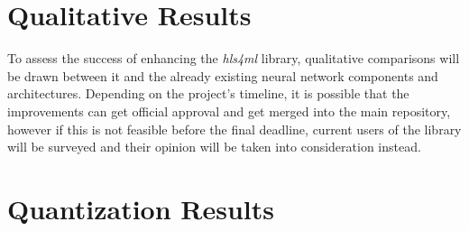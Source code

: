 \section{Qualitative Results}
To assess the success of enhancing the \textit{hls4ml} library, qualitative comparisons will be drawn between it and the already existing neural network components and architectures. Depending on the project's timeline, it is possible that the improvements can get official approval and get merged into the main repository, however if this is not feasible before the final deadline, current users of the library will be surveyed and their opinion will be taken into consideration instead.

\section{Quantization Results}

